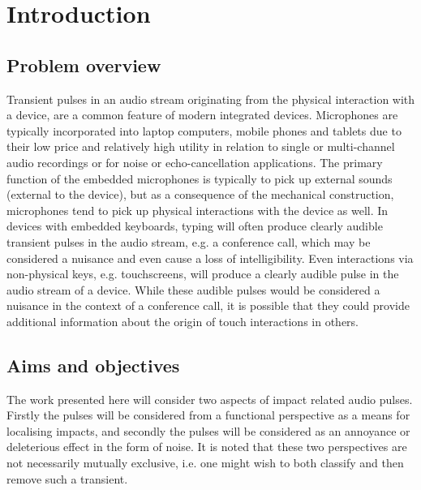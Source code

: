 \chapter{Introduction}\label{ch:Introduction}
\ifpdf
    \graphicspath{{Introduction/IntroductionFigs/PNG/}{Introduction/IntroductionFigs/PDF/}{Introduction/IntroductionFigs/}}
\else
    \graphicspath{{Introduction/IntroductionFigs/EPS/}{Introduction/IntroductionFigs/}}
\fi

\section{Problem overview}
Transient pulses in an audio stream originating from the physical interaction with a device, are a common feature of modern integrated devices. Microphones are typically incorporated into laptop computers, mobile phones and tablets due to their low price and relatively high utility in relation to single or multi-channel audio recordings or for noise or echo-cancellation applications. The primary function of the embedded microphones is typically to pick up external sounds (external to the device), but as a consequence of the mechanical construction, microphones tend to pick up physical interactions with the device as well. In devices with embedded keyboards, typing will often produce clearly audible transient pulses in the audio stream, e.g. a conference call, which may be considered a nuisance and even cause a loss of intelligibility. Even interactions via non-physical keys, e.g. touchscreens, will produce a clearly audible pulse in the audio stream of a device. While these audible pulses would be considered a nuisance in the context of a conference call, it is possible that they could provide additional information about the origin of touch interactions in others.

\section{Aims and objectives}
The work presented here will consider two aspects of impact related audio pulses. Firstly the pulses will be considered from a functional perspective as a means for localising impacts, and secondly the pulses will be considered as an annoyance or deleterious effect in the form of noise. It is noted that these two perspectives are not necessarily mutually exclusive, i.e. one might wish to both classify and then remove such a transient.

